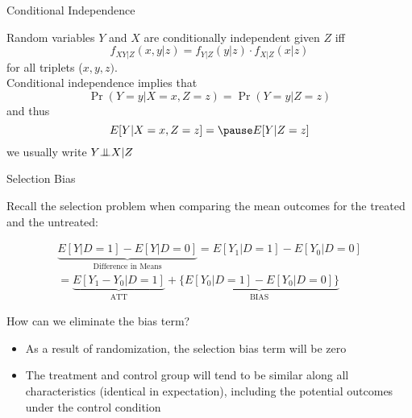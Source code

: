 \documentclass{beamer}
\numberwithin{equation}{section}
\newcommand{\indep}{{\bot\negthickspace\negthickspace\bot}}
\begin{document}
\begin{frame}{Conditional Independence}

\begin{Definition}
Random variables $Y$ and $X$ are conditionally independent given $Z$ iff \pause 
  $$f_{XY|Z}(x, y | z) = f_{Y|Z}(y | z) \cdot f_{X|Z}(x|z)
$$ for all triplets ($x,y,z)$.\\\medskip Conditional independence implies that $$
\Pr(Y = y | X = x,Z = z) = \Pr(Y = y | Z = z)
$$
and thus$$
E[Y| X = x, Z = z] = \pause  E[Y| Z = z]
$$
we usually write $Y \indep X | Z$
\end{Definition}

\end{frame}



\begin{frame}{Selection Bias}

Recall the selection problem when comparing the mean outcomes for the
treated and the untreated:

\begin{problem}
\begin{equation}
\begin{split}
\underbrace{E[Y|D=1]-E[Y|D=0]}_{\mbox{Difference in Means}}=E[Y_1 | D=1]-E[Y_0 | D=0]\\
                 =\underbrace{E[Y_1 - Y_0 | D=1]}_{\mbox{ATT}}
                 +\underbrace{\{E[Y_0 | D=1]-E[Y_0 | D=0]\}}_{\mbox{BIAS}}\nonumber
\end{split}
\end{equation}
\end{problem}

How can we eliminate the bias term? \pause

\begin{itemize}
\itemsep1pt\parskip0pt
\item
  As a result of randomization, the selection bias term will be zero
\item
  The treatment and control group will tend to be similar along all
  characteristics (identical in expectation), including the potential
  outcomes under the control condition
\end{itemize}

\end{frame}
\end{document}
